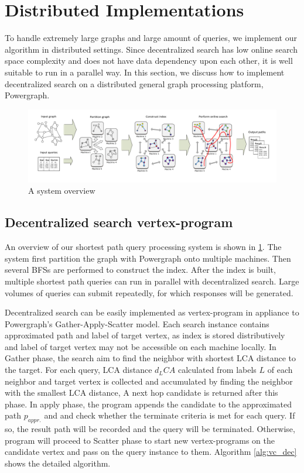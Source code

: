 \section{Distributed Implementations}
\label{implementation}

To handle extremely large graphs and large amount of queries, we implement our algorithm in distributed settings. Since decentralized search has low online search space complexity and does not have data dependency upon each other, it is well suitable to run in a parallel way. In this section, we discuss how to implement decentralized search on a distributed general graph processing platform, Powergraph\cite{180251}.

\begin{figure}[ht]
    \centering
    \includegraphics[width=\linewidth]{./figures/new_illustrate/System.pdf}
    \caption{A system overview}
    \label{fig:system}
\end{figure}

\subsection{Decentralized search vertex-program}

An overview of our shortest path query processing system is shown in \ref{fig:system}. The system first partition the graph with Powergraph onto multiple machines. Then several BFSs are performed to construct the index. After the index is built, multiple shortest path queries can run in parallel with decentralized search. Large volumes of queries can submit repeatedly, for which responses will be generated.

Decentralized search can be easily implemented as vertex-program in appliance to Powergraph's Gather-Apply-Scatter model. Each search instance contains approximated path and label of target vertex, as index is stored distributively and label of target vertex may not be accessible on each machine locally. In Gather phase, the search aim to find the neighbor with shortest LCA distance to the target. For each query, LCA distance $d_LCA$ calculated from labels $L$ of each neighbor and target vertex is collected and accumulated by finding the neighbor with the smallest LCA distance, A next hop candidate is returned after this phase. In apply phase, the program appends the candidate to the approximated path $p_{appr.}$ and and check whether the terminate criteria is met for each query. If so, the result path will be recorded and the query will be terminated. Otherwise, program will proceed to Scatter phase to start new vertex-programs on the candidate vertex and pass on the query instance to them. Algorithm \ref{alg:vc_dec} shows the detailed algorithm.

